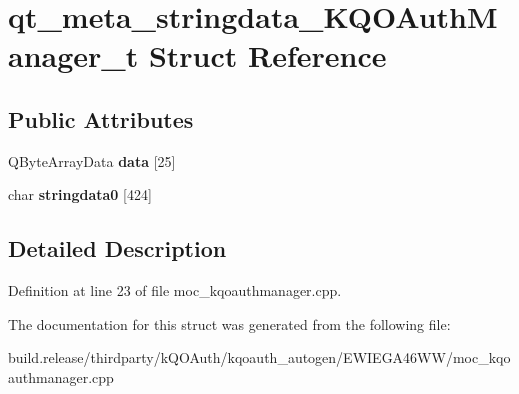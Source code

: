 \hypertarget{structqt__meta__stringdata___k_q_o_auth_manager__t}{}\section{qt\+\_\+meta\+\_\+stringdata\+\_\+\+K\+Q\+O\+Auth\+Manager\+\_\+t Struct Reference}
\label{structqt__meta__stringdata___k_q_o_auth_manager__t}
\subsection*{Public Attributes}
\begin{DoxyCompactItemize}
\item 
\mbox{\label{structqt__meta__stringdata___k_q_o_auth_manager__t_a7453a23683f679bcf7de92eab110ba9a}} 
Q\+Byte\+Array\+Data {\bfseries data} \mbox{[}25\mbox{]}
\item 
\mbox{\label{structqt__meta__stringdata___k_q_o_auth_manager__t_a01239fb8a747636b82786cc4efd9d909}} 
char {\bfseries stringdata0} \mbox{[}424\mbox{]}
\end{DoxyCompactItemize}


\subsection{Detailed Description}


Definition at line 23 of file moc\+\_\+kqoauthmanager.\+cpp.



The documentation for this struct was generated from the following file\+:\begin{DoxyCompactItemize}
\item 
build.\+release/thirdparty/k\+Q\+O\+Auth/kqoauth\+\_\+autogen/\+E\+W\+I\+E\+G\+A46\+W\+W/moc\+\_\+kqoauthmanager.\+cpp\end{DoxyCompactItemize}
